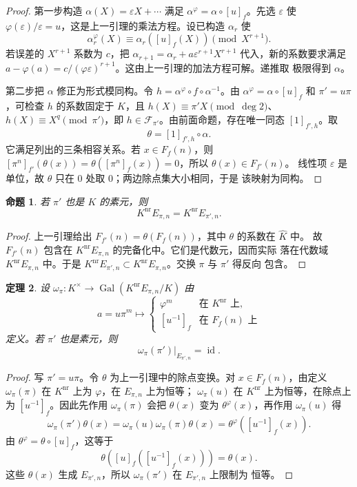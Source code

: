 \documentclass[11pt,a4paper,openany]{ctexbook}
\numberwithin{equation}{chapter}
\newcommand{\Gal}{\operatorname{Gal}}
\theoremstyle{plain}
\newtheorem{theorem}{定理}[chapter]
\newtheorem{proposition}[theorem]{命题}
\theoremstyle{definition}
\theoremstyle{remark}
\begin{document}
\begin{proof}
第一步构造 $\alpha(X)=\varepsilon X+\cdots$ 满足
$\alpha^\varphi=\alpha\circ[u]_f$。先选 $\varepsilon$ 使
$\varphi(\varepsilon)/\varepsilon=u$，这是上一引理的乘法方程。设已构造
$\alpha_r$ 使
\[
\alpha_r^\varphi(X)\equiv \alpha_r([u]_f(X))\pmod{X^{r+1}}.
\]
若误差的 $X^{r+1}$ 系数为 $c$，把
$\alpha_{r+1}=\alpha_r+a\varepsilon^{r+1}X^{r+1}$ 代入，新的系数要求满足
$a-\varphi(a)=c/(\varphi\varepsilon)^{r+1}$。这由上一引理的加法方程可解。递推取
极限得到 $\alpha$。

第二步把 $\alpha$ 修正为形式模同构。令
$h=\alpha^\varphi\circ f\circ\alpha^{-1}$。由
$\alpha^\varphi=\alpha\circ[u]_f$ 和 $\pi'=u\pi$，可检查 $h$ 的系数固定于
$K$，且 $h(X)\equiv\pi'X\pmod{\deg2}$、$h(X)\equiv X^q\pmod{\pi'}$，即
$h\in\mathcal F_{\pi'}$。由前面命题，存在唯一同态 $[1]_{f',h}$。取
\[
\theta=[1]_{f',h}\circ\alpha.
\]
它满足列出的三条相容关系。若 $x\in F_f(n)$，则
$[\pi^n]_{f'}(\theta(x))=\theta([\pi^n]_f(x))=0$，所以 $\theta(x)\in F_{f'}(n)$。
线性项 $\varepsilon$ 是单位，故 $\theta$ 只在 $0$ 处取 $0$；两边除点集大小相同，于是
该映射为同构。
\end{proof}

\begin{proposition}
若 $\pi'$ 也是 $K$ 的素元，则
\[
K^{\mathrm{nr}}E_{\pi,n}=K^{\mathrm{nr}}E_{\pi',n}.
\]
\end{proposition}

\begin{proof}
上一引理给出 $F_{f'}(n)=\theta(F_f(n))$，其中 $\theta$ 的系数在 $\widehat K$ 中。
故 $F_{f'}(n)$ 包含在 $K^{\mathrm{nr}}E_{\pi,n}$ 的完备化中。它们是代数元，因而实际
落在代数域 $K^{\mathrm{nr}}E_{\pi,n}$ 中。于是
$K^{\mathrm{nr}}E_{\pi',n}\subset K^{\mathrm{nr}}E_{\pi,n}$。交换 $\pi$ 与 $\pi'$ 得反向
包含。
\end{proof}

\begin{theorem}
设 $\omega_\pi:K^\times\to\Gal(K^{\mathrm{nr}}E_{\pi,n}/K)$ 由
\[
a=u\pi^m\mapsto
\begin{cases}
\varphi^m&\text{在 }K^{\mathrm{nr}}\text{ 上},\\
[u^{-1}]_f&\text{在 }F_f(n)\text{ 上}
\end{cases}
\]
定义。若 $\pi'$ 也是素元，则
\[
\omega_\pi(\pi')|_{E_{\pi',n}}=\operatorname{id}.
\]
\end{theorem}

\begin{proof}
写 $\pi'=u\pi$。令 $\theta$ 为上一引理中的除点变换。对 $x\in F_f(n)$，由定义
$\omega_\pi(\pi)$ 在 $K^{\mathrm{nr}}$ 上为 $\varphi$，在 $E_{\pi,n}$ 上为恒等；
$\omega_\pi(u)$ 在 $K^{\mathrm{nr}}$ 上为恒等，在除点上为 $[u^{-1}]_f$。因此先作用
$\omega_\pi(\pi)$ 会把 $\theta(x)$ 变为 $\theta^\varphi(x)$，再作用 $\omega_\pi(u)$ 得
\[
\omega_\pi(\pi')\theta(x)
=\omega_\pi(u)\omega_\pi(\pi)\theta(x)
=\theta^\varphi([u^{-1}]_f(x)).
\]
由 $\theta^\varphi=\theta\circ[u]_f$，这等于
\[
\theta([u]_f([u^{-1}]_f(x)))=\theta(x).
\]
这些 $\theta(x)$ 生成 $E_{\pi',n}$，所以 $\omega_\pi(\pi')$ 在 $E_{\pi',n}$ 上限制为
恒等。
\end{proof}
\end{document}
